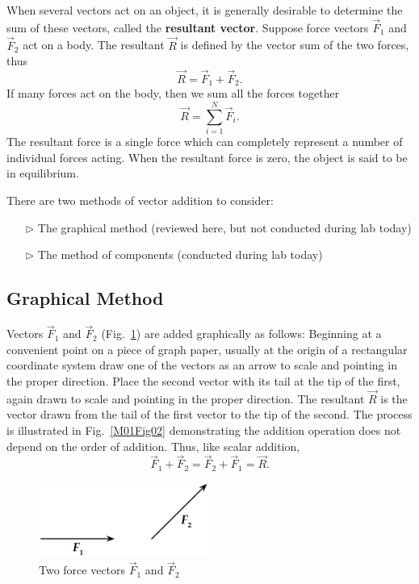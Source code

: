 When several vectors act on an object, it is generally desirable to determine the sum of these vectors, called the \textbf{resultant vector}. Suppose force vectors $\vec{F}_1$ and $\vec{F}_2$ act on a body. The resultant $\vec{R}$ is defined by the vector sum of the two forces, thus
\begin{equation}
   \vec{R} = \vec{F}_1 + \vec{F}_2.
\end{equation}
If many forces act on the body, then we sum all the forces together
\begin{equation}
  \vec{R} = \sum_{i=1}^N \vec{F}_i.
\end{equation}
The resultant force is a single force which can completely represent a number of individual forces acting.  When the resultant force is zero, the object is said to be in equilibrium.

\pagebreak

There are two methods of vector addition to consider:
\begin{enumerate}
\item[$\triangleright$] The graphical method (reviewed here, but not conducted during lab today)
\item[$\triangleright$] The method of components (conducted during lab today)
\end{enumerate}

\subsection{Graphical Method}

Vectors $\vec{F}_1$ and $\vec{F}_2$  (Fig.~\ref{M01Fig01}) are added graphically as follows:
Beginning at a convenient point on a piece of graph paper, usually at the origin of a rectangular coordinate system draw one of the vectors as an arrow to scale and pointing in the proper direction.  Place the second vector with its tail at the tip of the first, again drawn to scale and pointing in the proper direction.  The resultant $\vec{R}$ is the vector drawn from the tail of the first vector to the tip of the second.  The process is illustrated in Fig.~\ref{M01Fig02} demonstrating the addition operation does not depend on the order of addition.  Thus, like scalar addition,
\begin{equation}
  \vec{F}_1 + \vec{F}_2 = \vec{F}_2 + \vec{F}_1 = \vec{R}.
\end{equation}

\begin{figure}[ht]
  \begin{center}        
    \includegraphics[width=2.2in]{Fall/Experiment01Figures/M1_ForceTable_01.png}
  \end{center}
  \caption{Two force vectors $\vec{F}_1$ and $\vec{F}_2$}
  \label{M01Fig01}  %
\end{figure}



